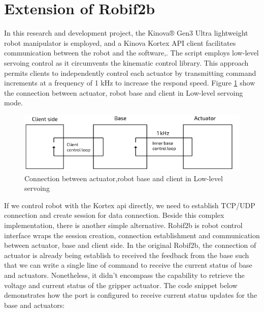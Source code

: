\documentclass[report.tex]{subfiles}
\begin{document}
    \section{Extension of Robif2b}
    \label{Robif2b}
    In this research and development project, the Kinova® Gen3 Ultra lightweight robot manipulator is employed, and a Kinova Kortex API client facilitates communication between the robot and the software\cite{Kinovaapi},\cite{KINOVA_userguide}. The script employs low-level servoing control as it circumvents the kinematic control library. This approach permits clients to independently control each actuator by transmitting command increments at a frequency of 1 kHz to increase the respond speed. Figure \ref{fig:kinova_low} show the connection between actuator, robot base and client in Low-level servoing mode.\begin{figure}[h!]
        \centering
        \includegraphics[width=1\linewidth]{images/kinovalowlevel.png}
        \caption{Connection between actuator,robot base and client in Low-level servoing}
        \label{fig:kinova_low}
    \end{figure}
    If we control robot with the Kortex api directly, we need to establish TCP/UDP connection and create session for data connection. Beside this complex implementation, there is another simple alternative. Robif2b is robot control interface wraps the session creation, connection establishment and communication between actuator, base and client side\cite{Rosym-Project}. In the original Robif2b, the connection of actuator is already being establish to received the feedback from the base such that we can write a single line of command to receive the current status of base and actuators. Nonetheless, it didn't encompass the capability to retrieve the voltage and current status of the gripper actuator. The code snippet below demonstrates how the port is configured to receive current status updates for the base and actuators:
\end{document}

